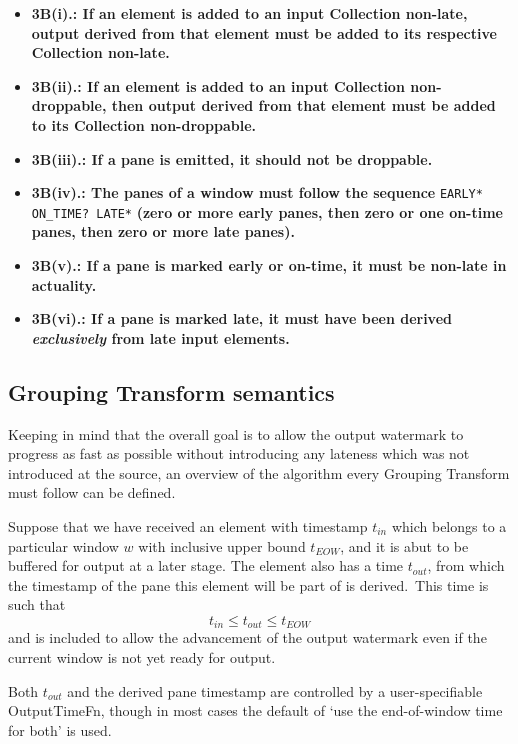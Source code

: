 \begin{itemize}
	\item \textbf{3B(i).: If an element is added to an input Collection non-late, output derived from that element must be added to its respective Collection non-late.}
	\item \textbf{3B(ii).: If an element is added to an input Collection non-droppable, then output derived from that element must be added to its Collection non-droppable.}
	\item \textbf{3B(iii).: If a pane is emitted, it should not be droppable.}
	\item\textbf{ 3B(iv).: The panes of a window must follow the sequence} \verb|EARLY* ON_TIME? LATE*| \textbf{(zero or more early panes, then zero or one on-time panes, then zero or more late panes).}
	\item \textbf{3B(v).: If a pane is marked early or on-time, it must be non-late in actuality.}
	\item \textbf{3B(vi).: If a pane is marked late, it must have been derived \emph{exclusively} from late input elements.}
\end{itemize}

\subsection{Grouping Transform semantics}\label{sec:impl:dataflow:grouping}


Keeping in mind that the overall goal is to allow the output watermark to progress as fast as possible without introducing any lateness which was not introduced at the source, an overview of the algorithm every Grouping Transform must follow can be defined.

Suppose that we have received an element with timestamp $t_{\mathit{in}}$ which belongs to a particular window $w$ with inclusive upper bound $t_{\mathit{EOW}}$, and it is abut to be buffered for output at a later stage.
The element also has a time $t_{\mathit{out}}$, from which the timestamp of the pane this element will be part of is derived.\footnotemark\ 
This time is such that \[t_{\mathit{in}} \leq t_{\mathit{out}} \leq t_{\mathit{EOW}}\] and is included to allow the advancement of the output watermark even if the current window is not yet ready for output.

\footnotetext
{
Both $t_{\mathit{out}}$ and the derived pane timestamp are controlled by a user-specifiable OutputTimeFn, though in most cases the default of `use the end-of-window time for both' is used.
}

